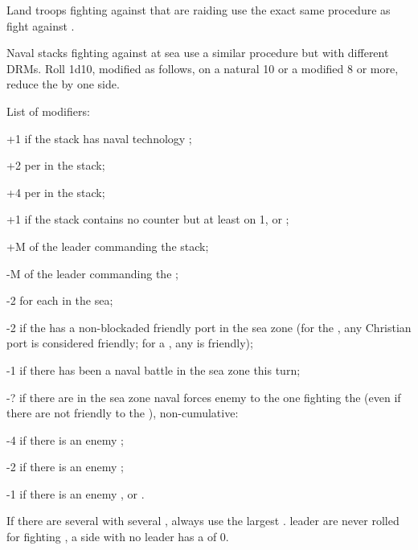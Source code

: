 Land troops fighting against \corsaire that are raiding use the exact same
procedure as fight against \RevReb.

Naval stacks fighting against \corsaire at sea use a similar procedure but
with different DRMs. Roll 1d10, modified as follows, on a natural 10 or a
modified 8 or more, reduce the \corsaire by one side.

List of modifiers:
\begin{modlist}
\item[+1] if the stack has naval technology \TSF;
\item[+2] per \FLEET\facemoins in the stack;
\item[+4] per \FLEET\faceplus in the stack;
\item[+1] if the stack contains no \FLEET counter but at least on 1\NDE, \NWD
  or \NGD;
\item[+M] \Man of the leader commanding the stack;
\item[-M] \Man of the leader commanding the \corsaire;
\item[-2] for each \corsaire\faceplus in the sea;
\item[-2] if the \corsaire has a non-blockaded friendly port in the sea zone
  (for the  \corsaire, any Christian port is considered
  friendly; for a  \corsaire, any  is
  friendly);
\item[-1] if there has been a naval battle in the sea zone this turn;
\item[-?] if there are in the sea zone naval forces enemy to the one fighting
  the \corsaire (even if there are not friendly to the \corsaire),
  non-cumulative:
  \begin{modlisti}
  \item[-4] if there is an enemy \FLEET\faceplus;
  \item[-2] if there is an enemy \FLEET\facemoins;
  \item[-1] if there is an enemy \NDE, \NWD or \NGD.
  \end{modlisti}
\end{modlist}

If there are several \corsaire with several \LeaderP, always use the largest
\Man.  leader are never rolled for fighting \corsaire, a
side with no leader has a \Man of 0.

